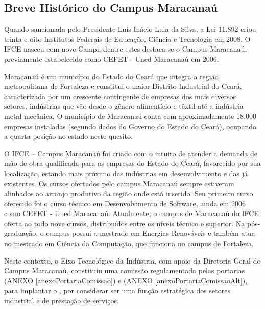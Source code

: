 \documentclass{paper}
\begin{document}
\subsection{Breve Histórico do Campus Maracanaú}

Quando sancionada pelo Presidente Luis Inácio Lula da Silva, a Lei 11.892 criou trinta e oito Institutos Federais de Educação, Ciência e Tecnologia em 2008. O IFCE nasceu com nove Campi, dentre estes destaca-se o Campus Maracanaú, previamente estabelecido como CEFET - Uned Maracanaú em 2006.

Maracanaú é um município do Estado do Ceará que integra a região metropolitana de Fortaleza e constitui o maior Distrito Industrial do Ceará, caracterizada por um crescente contingente de empresas dos mais diversos setores, indústrias que vão desde o gênero alimentício e têxtil até a indústria metal-mecânica. O município de Maracanaú conta com aproximadamente 18.000 empresas instaladas (segundo dados do Governo do Estado do Ceará), ocupando a quarta posição no estado neste quesito.

O IFCE – Campus Maracanaú foi criado com o intuito de atender a demanda de mão de obra qualificada para as empresas do Estado do Ceará, favorecido por sua localização, estando mais próximo das indústrias em desenvolvimento e das já
existentes. Os cursos ofertados pelo campus Maracanaú sempre estiveram alinhados ao arranjo produtivo da região onde está inserido. Seu primeiro curso oferecido foi o curso técnico em Desenvolvimento de Software, ainda em 2006 como CEFET - Uned Maracanaú. Atualmente, o campus de Maracanaú do IFCE oferta ao todo nove cursos, distribuídos entre os níveis técnico e superior. Na pós-graduação, o campus possui o mestrado em Energias Renováveis e também atua no mestrado em Ciência da Computação, que funciona no campus de Fortaleza.

Neste contexto, o Eixo Tecnológico da Indústria, com apoio da Diretoria Geral do Campus Maracanaú, constituiu uma comissão regulamentada pelas portarias  \PORTARIACOMISSAO (ANEXO \ref{anexoPortariaComissao}) e  \PORTARIACOMISSAOALT (ANEXO \ref{anexoPortariaComissaoAlt}), para implantar 
o \NOMECURSO, por considerar ser uma função estratégica dos setores industrial e de prestação de serviços.
\end{document}
